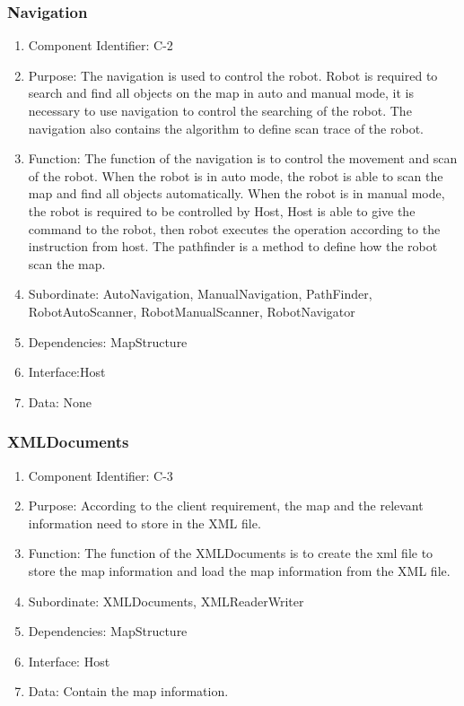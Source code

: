 \documentclass[11pt, a4paper]{report}
\begin{document}
\subsubsection{Navigation}
\begin{enumerate}
\item Component Identifier: C-2
\item Purpose: The navigation is used to control the robot. Robot is required to search and find all objects on the map in auto and manual mode, it is necessary to use navigation to control the searching of the robot. The navigation also contains the algorithm to define scan trace of the robot. 
\item Function: The function of the navigation is to control the movement and scan of the robot. When the robot is in auto mode, the robot is able to scan the map and find all objects automatically. When the robot is in manual mode, the robot is required to be controlled by Host, Host is able to give the command to the robot, then robot executes the operation according to the instruction from host. The pathfinder is a method to define how the robot scan the map. 
\item Subordinate: AutoNavigation, ManualNavigation, PathFinder, RobotAutoScanner, RobotManualScanner, RobotNavigator
\item Dependencies: MapStructure
\item Interface:Host
\item Data: None
\end{enumerate}

\subsubsection{XMLDocuments}
\begin{enumerate}
\item Component Identifier: C-3
\item Purpose: According to the client requirement, the map and the relevant information need to store in the XML file. 
\item Function: The function of the XMLDocuments is to create the xml file to store the map information and load the map information from the XML file. 
\item Subordinate: XMLDocuments, XMLReaderWriter
\item Dependencies: MapStructure
\item Interface: Host
\item Data: Contain the map information.
\end{enumerate}
\end{document}
